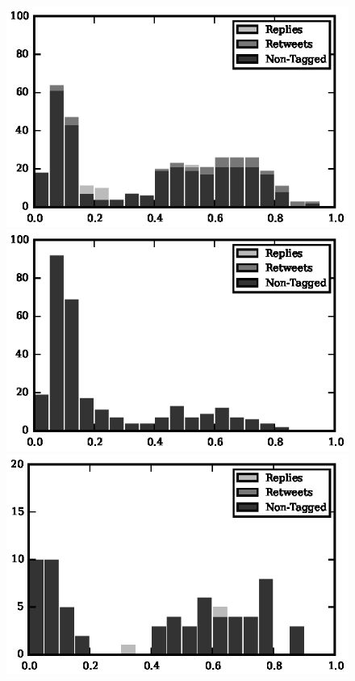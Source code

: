 \begin{figure}[!tb]
\centering
\includegraphics[scale=0.9]{./figures/213501392_histogram.eps}
\includegraphics[scale=0.9]{./figures/808181892_histogram.eps}
\includegraphics[scale=0.9]{./figures/87339782_histogram.eps}

\end{figure}
